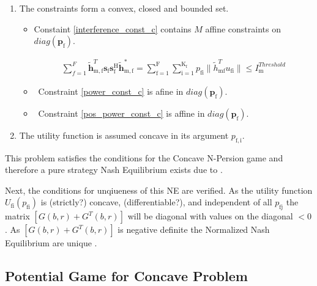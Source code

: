 \documentclass[12pt,a4paper]{report}
\begin{document}
\begin{enumerate}

\item
The constraints form a convex, closed and bounded set. 

\begin{itemize}

\item
	Constaint \eqref{interference_const_c} contains $M$ affine constraints on $diag(\mathbf{p_{\mathrm{f}}})$.

\begin{gather*}
	  \sum^F_{f=1} \mathbf{\tilde{h}}_{\mathrm{m,f}}^T  \mathbf{s}_{\mathrm{f}} 						
	\mathbf{s_{\mathrm{f}}^{\mathrm{H}}} \mathbf{\tilde{h}_{\mathrm{m,f}}^*} 
	=
	\sum_{\mathrm{f=1}}^{\mathrm{F}}	\sum_{\mathrm{i=1}}^{\mathrm{K_f}}
	p_{\mathrm{fi}}\|\tilde{h}_{\mathrm{mf}}^T u_{\mathrm{fi}}\|
	\leq I^{Threshold}_{\mathrm{m}} 
\end{gather*}

\item \
	Constraint \eqref{power_const_c} is  afine in $diag(\mathbf{p_{\mathrm{f}}})$.
	
\item \
	Constraint \eqref{pos_power_const_c} is affine in $diag(\mathbf{p_{\mathrm{f}}})$.
\end{itemize}


\item The utility function is assumed concave in its argument $p_{\mathrm{f,i}}$.

\end{enumerate}

This problem satisfies the conditions for the Concave N-Persion game and therefore a pure strategy Nash Equilibrium exists due to 
\cite[Thm1]{rosen1964existence}.

Next, the conditions for unqiueness of this NE are verified. As the utility function $U_{\mathrm{fi}}(p_{\mathrm{fi}})$ is (strictly?) concave, (differentiable?), and independent of all $p_{\mathrm{fj}}$ the matrix $[G(b,r)+G^{T}(b,r)] $ will be diagonal with values on the diagonal $<0$. As $[G(b,r)+G^{T}(b,r)] $ is negative definite the Normalized Nash Equilibrium are unique \cite[Thm4]{rosen1964existence}.

\subsection{Potential Game for Concave Problem}
\end{document}
